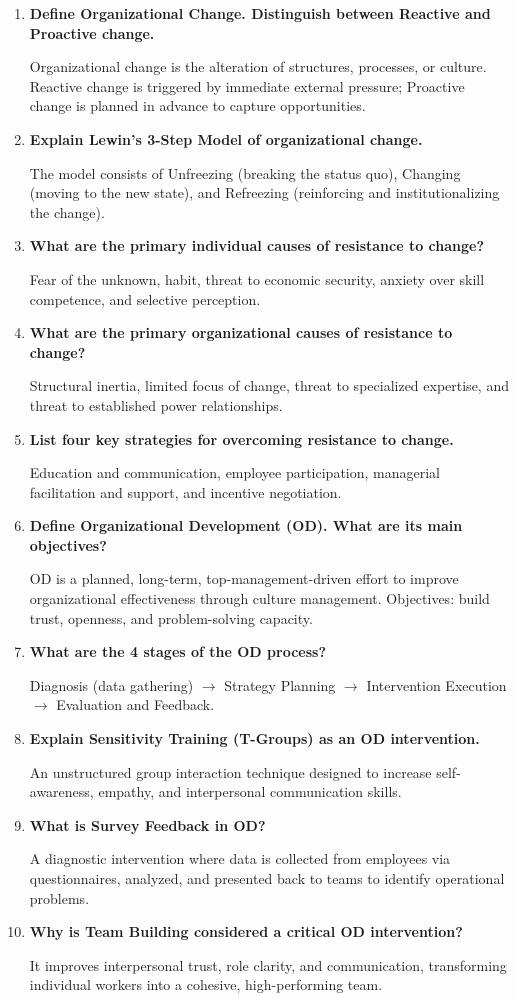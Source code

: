 \documentclass[11pt,a4paper]{article}
\newcommand{\Q}[1]{\textbf{#1}\par\noindent\ignorespaces}
\begin{document}
\begin{tcolorbox}[exambox, title={\textbf{Frequently Asked / Viva Questions}}]
\begin{enumerate}[leftmargin=*, itemsep=4pt]
  \item \Q{Define Organizational Change. Distinguish between Reactive and Proactive change.}
    Organizational change is the alteration of structures, processes, or culture. Reactive change is triggered by immediate external pressure; Proactive change is planned in advance to capture opportunities.
  
  \item \Q{Explain Lewin's 3-Step Model of organizational change.}
    The model consists of Unfreezing (breaking the status quo), Changing (moving to the new state), and Refreezing (reinforcing and institutionalizing the change).
  
  \item \Q{What are the primary individual causes of resistance to change?}
    Fear of the unknown, habit, threat to economic security, anxiety over skill competence, and selective perception.
  
  \item \Q{What are the primary organizational causes of resistance to change?}
    Structural inertia, limited focus of change, threat to specialized expertise, and threat to established power relationships.
  
  \item \Q{List four key strategies for overcoming resistance to change.}
    Education and communication, employee participation, managerial facilitation and support, and incentive negotiation.
  
  \item \Q{Define Organizational Development (OD). What are its main objectives?}
    OD is a planned, long-term, top-management-driven effort to improve organizational effectiveness through culture management. Objectives: build trust, openness, and problem-solving capacity.
  
  \item \Q{What are the 4 stages of the OD process?}
    Diagnosis (data gathering) $\to$ Strategy Planning $\to$ Intervention Execution $\to$ Evaluation and Feedback.
  
  \item \Q{Explain Sensitivity Training (T-Groups) as an OD intervention.}
    An unstructured group interaction technique designed to increase self-awareness, empathy, and interpersonal communication skills.
  
  \item \Q{What is Survey Feedback in OD?}
    A diagnostic intervention where data is collected from employees via questionnaires, analyzed, and presented back to teams to identify operational problems.
  
  \item \Q{Why is Team Building considered a critical OD intervention?}
    It improves interpersonal trust, role clarity, and communication, transforming individual workers into a cohesive, high-performing team.
\end{enumerate}
\end{tcolorbox}
\end{document}
